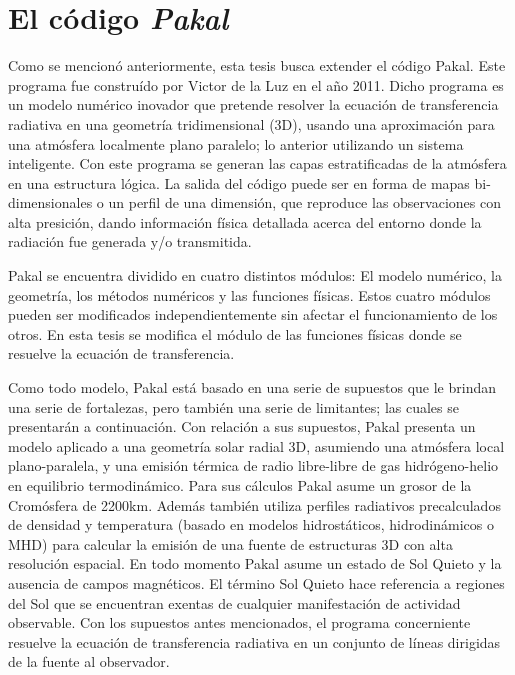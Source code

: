 \documentclass[9pt]{book}
\begin{document}
\section{El c\'odigo \emph{Pakal}}
Como se mencion\'o anteriormente, esta tesis busca extender el c\'odigo Pakal. Este programa fue constru\'ido por Victor de la Luz en el a\~no 2011\cite{Pakal}. Dicho programa es un modelo num\'erico inovador que pretende resolver la ecuaci\'on de transferencia radiativa en una geometr\'ia tridimensional (3D), usando una aproximaci\'on para una atm\'osfera localmente plano paralelo; lo anterior utilizando un sistema inteligente. Con este programa se generan las capas estratificadas de la atm\'osfera en una estructura l\'ogica. La salida del c\'odigo puede ser en forma de mapas bi-dimensionales o un perfil de una dimensi\'on, que reproduce las observaciones con alta presici\'on, dando informaci\'on f\'isica detallada acerca del entorno donde la radiaci\'on fue generada y/o transmitida.

Pakal se encuentra dividido en cuatro distintos m\'odulos: El modelo num\'erico, la geometr\'ia, los m\'etodos num\'ericos y las funciones f\'isicas. Estos cuatro m\'odulos pueden ser modificados independientemente sin afectar el funcionamiento de los otros. En esta tesis se modifica el m\'odulo de las funciones f\'isicas donde se resuelve la ecuaci\'on de transferencia.

Como todo modelo, Pakal est\'a basado en una serie de supuestos que le brindan una serie de fortalezas, pero tambi\'en una serie de limitantes; las cuales se presentar\'an a continuaci\'on. Con relaci\'on a sus supuestos, Pakal presenta un modelo aplicado a una geometr\'ia solar radial 3D, asumiendo una atm\'osfera local plano-paralela, y una emisi\'on t\'ermica de radio libre-libre de gas hidr\'ogeno-helio en equilibrio termodin\'amico. Para sus c\'alculos Pakal asume un grosor de la Crom\'osfera de 2200km. Adem\'as tambi\'en utiliza perfiles radiativos precalculados de densidad y temperatura (basado en modelos hidrost\'aticos, hidrodin\'amicos o MHD) para calcular la emisi\'on de una fuente de estructuras 3D con alta resoluci\'on espacial. En todo momento Pakal asume un estado de Sol Quieto y la ausencia de campos magn\'eticos. El t\'ermino Sol Quieto hace referencia a regiones del Sol que se encuentran exentas de cualquier manifestaci\'on de actividad observable. Con los supuestos antes mencionados, el programa concerniente resuelve la ecuaci\'on de transferencia radiativa en un conjunto de l\'ineas dirigidas de la fuente al observador.
\end{document}

